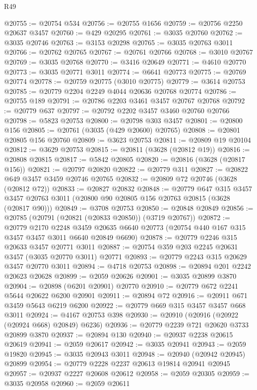 \begin{lexlean}{R49}
\begin{coremodule}
@20755 := @20754 @534
@20756 := @20755 @1656
@20759 := @20756 @2250 @20637 @3457
@20760 := @429 @20295
@20761 := @3035 @20760
@20762 := @3035 @20746
@20763 := @3153 @20298
@20765 := @3035 @20763 @3011
@20766 := @20762 @20765
@20767 := @20761 @20766
@20768 := @3010 @20767
@20769 := @3035 @20768
@20770 := @3416 @20649
@20771 := @4610 @20770
@20773 := @3035 @20771 @3011
@20774 := @6641 @20773
@20775 := @20769 @20774
@20778 := @20759 @20775 (@3010 @20775)
@20779 := @3614 @20753
@20785 := @20779 @2204 @2249 @4044 @20636 @20768 @20774
@20786 := @20755 @189
@20791 := @20786 @2203 @3461 @3457 @20767 @20768
@20792 := @20779 @637
@20797 := @20792 @2202 @3457 @3460 @20760 @20766
@20798 := @5823 @20753
@20800 := @20798 @303 @3457
@20801 := @20800 @156
@20805 := @20761 (@3035 (@429 @20600) @20765)
@20808 := @20801 @20805 @156 @20760
@20809 := @3623 @20753
@20811 := @20809 @19 @20104
@20812 := @3629 @20753
@20815 := @20811 (@3628 (@20812 @19))
@20816 := @20808 @20815
@20817 := @5842 @20805
@20820 := @20816 (@3628 (@20817 @156))
@20821 := @20797 @20820
@20822 := @20779 @311
@20827 := @20822 @649 @3457 @3459 @20746 @20765
@20832 := @20809 @72 @20746 (@3628 (@20812 @72))
@20833 := @20827 @20832
@20848 := @20779
    @647
    @315
    @3457
    @3457
    @20763
    @3011
    (@20800 @90 @20805 @156 @20763 @20815 (@3628 (@20817 @90)))
@20849 := @3708 @20753
@20850 := @20848 @20849
@20856 := @20785 (@20791 (@20821 (@20833 @20850)) (@3719 @20767))
@20872 := @20779
    @2170
    @2248
    @3459
    @20635
    @6640
    @20773
    (@20754 @440 @167 @315 @3457 @3457 @3011 @6640 @20849 @6690)
@20878 := @20779 @2246 @315 @20633 @3457 @20771 @3011
@20887 := @20754 @359 @203 @2245 @20631 @3457 (@3035 @20770 @3011) @20771
@20893 := @20779 @2243 @315 @20629 @3457 @20770 @3011
@20894 := @4718 @20753
@20898 := @20894 @201 @2242 @20623 @20628
@20899 := @2059 @20626
@20901 := @3035 @20899 @3870
@20904 := @20898 (@6201 @20901) @20770
@20910 := @20779 @672 @2241 @5644 @20622 @6200 @20901
@20911 := @20894 @72
@20916 := @20911 @671 @3459 @5643 @6219 @6200
@20922 := @20779 @669 @315 @3457 @3457 @668 @3011
@20924 := @4167 @20753 @398
@20930 := @20910 (@20916 (@20922 (@20924 @668) @20849) @6236)
@20936 := @20779 @2239 @721 @20620 @3733 @20899 @3870
@20937 := @20894 @130
@20940 := @20937 @2238 @20615 @20619
@20941 := @2059 @20617
@20942 := @3035 @20941
@20943 := @2059 @19820
@20945 := @3035 @20943 @3011
@20948 := @20940 (@20942 @20945) @20899
@20954 := @20779 @2228 @2237 @20613 @19814 @20941 @20945
@20957 := @20937 @2227 @20608 @20612
@20958 := @2059 @20305
@20959 := @3035 @20958
@20960 := @2059 @20611

\end{coremodule}
\end{lexlean}
